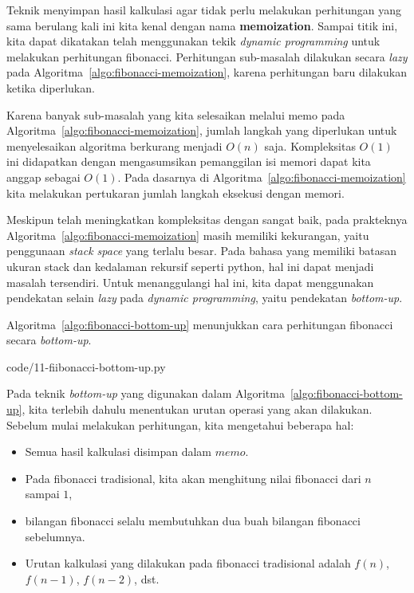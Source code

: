Teknik menyimpan hasil kalkulasi agar tidak perlu melakukan perhitungan yang sama berulang kali ini kita kenal dengan nama \textbf{memoization}. Sampai titik ini, kita dapat dikatakan telah menggunakan tekik \textit{dynamic programming} untuk melakukan perhitungan fibonacci. Perhitungan sub-masalah dilakukan secara \textit{lazy} pada Algoritma~\ref{algo:fibonacci-memoization}, karena perhitungan baru dilakukan ketika diperlukan.

Karena banyak sub-masalah yang kita selesaikan melalui memo pada Algoritma~\ref{algo:fibonacci-memoization}, jumlah langkah yang diperlukan untuk menyelesaikan algoritma berkurang menjadi $O(n)$ saja. Kompleksitas $O(1)$ ini didapatkan dengan mengasumsikan pemanggilan isi memori dapat kita anggap sebagai $O(1)$. Pada dasarnya di Algoritma~\ref{algo:fibonacci-memoization} kita melakukan pertukaran jumlah langkah eksekusi dengan memori.

Meskipun telah meningkatkan kompleksitas dengan sangat baik, pada prakteknya Algoritma~\ref{algo:fibonacci-memoization} masih memiliki kekurangan, yaitu penggunaan \textit{stack space} yang terlalu besar. Pada bahasa yang memiliki batasan ukuran stack dan kedalaman rekursif seperti python, hal ini dapat menjadi masalah tersendiri. Untuk menanggulangi hal ini, kita dapat menggunakan pendekatan selain \textit{lazy} pada \textit{dynamic programming}, yaitu pendekatan \textit{bottom-up}.

Algoritma~\ref{algo:fibonacci-bottom-up} menunjukkan cara perhitungan fibonacci secara \textit{bottom-up}.


                {code/11-fiibonacci-bottom-up.py}

Pada teknik \textit{bottom-up} yang digunakan dalam Algoritma~\ref{algo:fibonacci-bottom-up}, kita terlebih dahulu menentukan urutan operasi yang akan dilakukan. Sebelum mulai melakukan perhitungan, kita mengetahui beberapa hal:

\begin{itemize}
    \item Semua hasil kalkulasi disimpan dalam $memo$.
    \item Pada fibonacci tradisional, kita akan menghitung nilai fibonacci dari $n$ sampai $1$,
    \item bilangan fibonacci selalu membutuhkan dua buah bilangan fibonacci sebelumnya.
    \item Urutan kalkulasi yang dilakukan pada fibonacci tradisional adalah $f(n)$, $f(n - 1)$, $f(n -2)$, dst.
\end{itemize}


